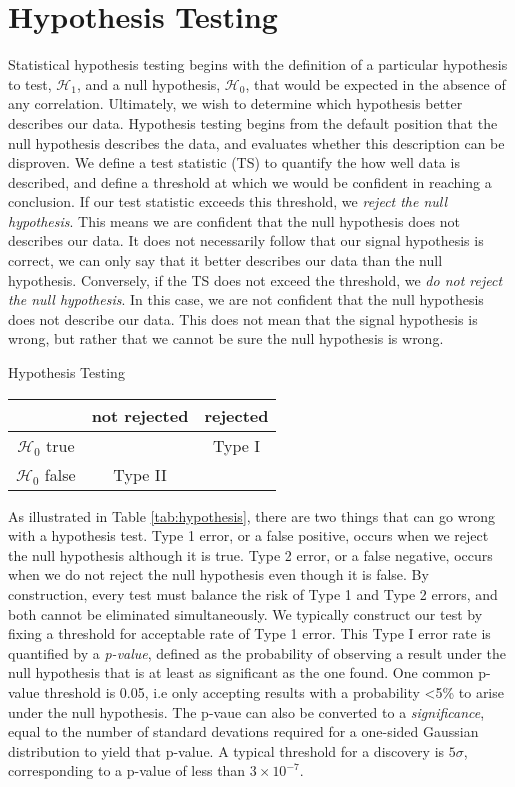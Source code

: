 \section{Hypothesis Testing}
Statistical hypothesis testing begins with the definition of a particular hypothesis to test, $\mathcal{H_{1}}$, and a null hypothesis, $\mathcal{H_{0}}$, that would be expected in the absence of any correlation. Ultimately, we wish to determine which hypothesis better describes our data. Hypothesis testing begins from the default position that the null hypothesis describes the data, and evaluates whether this description can be disproven. We define a test statistic (TS) to quantify the how well data is described, and define a threshold at which we would be confident in reaching a conclusion. If our test statistic exceeds this threshold, we \emph{reject the null hypothesis}. This means we are confident that the null hypothesis does not describes our data. It does not necessarily follow that our signal hypothesis is correct, we can only say that it better describes our data than the null hypothesis. Conversely, if the TS does not exceed the threshold,  we \emph{do not reject the null hypothesis}. In this case, we are not confident that the null hypothesis does not describe our data. This does not mean that the signal hypothesis is wrong, but rather that we cannot be sure the null hypothesis is wrong. 

\begin{margintable}
	\caption[]{Hypothesis Testing}
	\raggedright
	\begin{tabular}{ c|  c c}
		\hline
		& not rejected & rejected \\
		\hline
		$\mathcal{H_{0}}$ true & \checkmark & Type I \\
		$\mathcal{H_{0}}$ false &Type II & \checkmark\\
		\hline
	\end{tabular}
	\label{tab:hypothesis}
\end{margintable}

As illustrated in Table \ref{tab:hypothesis}, there are two things that can go wrong with a hypothesis test. Type 1 error, or a false positive, occurs when we reject the null hypothesis although it is true. Type 2 error, or a false negative, occurs when we do not reject the null hypothesis even though it is false. By construction, every test must balance the risk of Type 1 and Type 2 errors, and both cannot be eliminated simultaneously. We typically construct our test by fixing a threshold for acceptable rate of Type 1 error. This Type I error rate is quantified by a \emph{p-value}, defined as the probability of observing a result under the null hypothesis that is at least as significant as the one found. One common p-value threshold is 0.05, i.e only accepting results with a probability <5\% to arise under the null hypothesis. The p-vaue can also be converted to a \emph{significance}, equal to the number of standard devations required for a one-sided Gaussian distribution to yield that p-value. A typical threshold for a discovery is $5 \sigma$, corresponding to a p-value of less than $3 \times 10^{-7}$.

